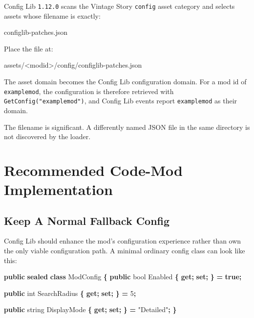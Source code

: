 \documentclass[
  11pt,
  letterpaper,
  titlepage]{article}
\newenvironment{Shaded}{\begin{snugshade}}{\end{snugshade}}
\newcommand{\DataTypeTok}[1]{\textcolor[rgb]{0.13,0.29,0.53}{#1}}
\newcommand{\DecValTok}[1]{\textcolor[rgb]{0.00,0.00,0.81}{#1}}
\newcommand{\KeywordTok}[1]{\textcolor[rgb]{0.13,0.29,0.53}{\textbf{#1}}}
\newcommand{\NormalTok}[1]{#1}
\newcommand{\OperatorTok}[1]{\textcolor[rgb]{0.81,0.36,0.00}{\textbf{#1}}}
\newcommand{\StringTok}[1]{\textcolor[rgb]{0.31,0.60,0.02}{#1}}
\begin{document}
Config Lib \texttt{1.12.0} scans the Vintage Story \texttt{config} asset
category and selects assets whose filename is exactly:

\begin{Shaded}
\begin{Highlighting}[]
\NormalTok{configlib{-}patches.json}
\end{Highlighting}
\end{Shaded}

Place the file at:

\begin{Shaded}
\begin{Highlighting}[]
\NormalTok{assets/\textless{}modid\textgreater{}/config/configlib{-}patches.json}
\end{Highlighting}
\end{Shaded}

The asset domain becomes the Config Lib configuration domain. For a mod
id of \texttt{examplemod}, the configuration is therefore retrieved with
\texttt{GetConfig("examplemod")}, and Config Lib events report
\texttt{examplemod} as their domain.

The filename is significant. A differently named JSON file in the same
directory is not discovered by the loader.

\section{Recommended Code-Mod
Implementation}\label{recommended-code-mod-implementation}

\subsection{Keep A Normal Fallback
Config}\label{keep-a-normal-fallback-config}

Config Lib should enhance the mod's configuration experience rather than
own the only viable configuration path. A minimal ordinary config class
can look like this:

\begin{Shaded}
\begin{Highlighting}[]
\KeywordTok{public} \KeywordTok{sealed} \KeywordTok{class}\NormalTok{ ModConfig}
\OperatorTok{\{}
    \KeywordTok{public} \DataTypeTok{bool}\NormalTok{ Enabled }\OperatorTok{\{} \KeywordTok{get}\OperatorTok{;} \KeywordTok{set}\OperatorTok{;} \OperatorTok{\}} \OperatorTok{=} \KeywordTok{true}\OperatorTok{;}

    \KeywordTok{public} \DataTypeTok{int}\NormalTok{ SearchRadius }\OperatorTok{\{} \KeywordTok{get}\OperatorTok{;} \KeywordTok{set}\OperatorTok{;} \OperatorTok{\}} \OperatorTok{=} \DecValTok{5}\OperatorTok{;}

    \KeywordTok{public} \DataTypeTok{string}\NormalTok{ DisplayMode }\OperatorTok{\{} \KeywordTok{get}\OperatorTok{;} \KeywordTok{set}\OperatorTok{;} \OperatorTok{\}} \OperatorTok{=} \StringTok{"Detailed"}\OperatorTok{;}
\OperatorTok{\}}
\end{Highlighting}
\end{Shaded}
\end{document}
